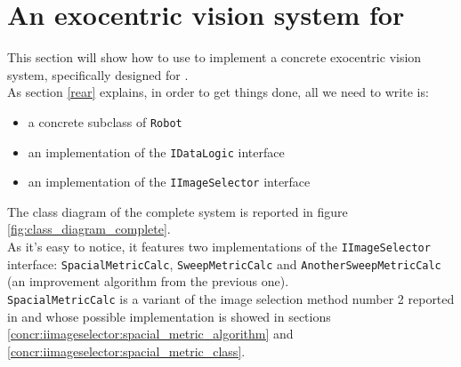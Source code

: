 \setcounter{figure}{0}
\setcounter{table}{0}
\setcounter{lstlisting}{0}

\chapter{An exocentric vision system for \morduc{}}
\label{concr}
\minitoc

This section will show how to use \framework{} to implement a 
concrete exocentric vision system, specifically designed for 
\morduc{}.
\\
As section \ref{rear} explains, in order to get things 
done, all we need to write is:

\begin{itemize}
\item a concrete subclass of \texttt{Robot}
\item an implementation of the \texttt{IDataLogic} interface
\item an implementation of the \texttt{IImageSelector} interface
\end{itemize}

The class diagram of the complete system is reported in figure
\ref{fig:class_diagram_complete}. 
\\
As it's easy to notice, it features two implementations 
of the \texttt{IImageSelector} interface: \texttt{SpacialMetricCalc},
\texttt{SweepMetricCalc} and \texttt{AnotherSweepMetricCalc}
(an improvement algorithm from the previous one).
\\
\texttt{SpacialMetricCalc} is a variant 
of the image selection method number 2 reported in \cite{sugimoto} and 
whose possible implementation is showed in sections
\ref{concr:iimageselector:spacial_metric_algorithm} and
\ref{concr:iimageselector:spacial_metric_class}.

